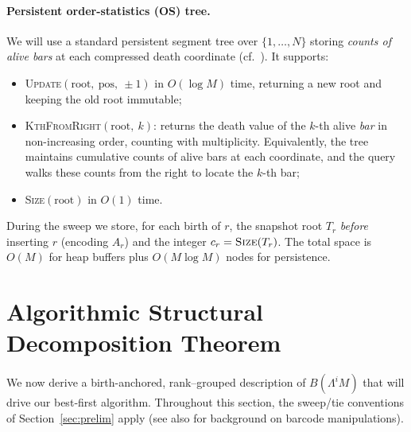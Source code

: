 \documentclass[runningheads]{llncs}
\newcommand{\B}{B}
\newcommand{\Lam}{\Lambda}
\begin{document}
\paragraph{Persistent order-statistics (OS) tree.}
We will use a standard persistent segment tree over $\{1,\dots,N\}$ storing
\emph{counts of alive bars} at each compressed death coordinate (cf.\
\cite{DriscollEtAl89}). It supports:
\begin{itemize}
  \item \textsc{Update}$(\text{root},\ \text{pos},\ \pm 1)$ in $O(\log M)$ time, returning a new root and keeping the old root immutable;
  \item \textsc{KthFromRight}$(\text{root},\ k)$: returns the death value of the $k$-th alive
        \emph{bar} in non-increasing order, counting with multiplicity. Equivalently,
        the tree maintains cumulative counts of alive bars at each coordinate,
        and the query walks these counts from the right to locate the $k$-th bar; 
  \item \textsc{Size}$(\text{root})$ in $O(1)$ time.
\end{itemize}
During the sweep we store, for each birth of $r$, the snapshot root $T_r$
\emph{before} inserting $r$ (encoding $A_r$) and the integer
$c_r=\textsc{Size}(T_r)$. The total space is $O(M)$ for heap buffers plus
$O(M\log M)$ nodes for persistence.

















\section{Algorithmic Structural Decomposition Theorem}\label{sec:structure}

We now derive a birth-anchored, rank–grouped description of $\B(\Lam^i M)$ that will drive our best‑first algorithm. Throughout this section, the sweep/tie conventions of Section~\ref{sec:prelim} apply (see also \cite{Ghrist08,Oudot15} for background on barcode manipulations).
\end{document}
